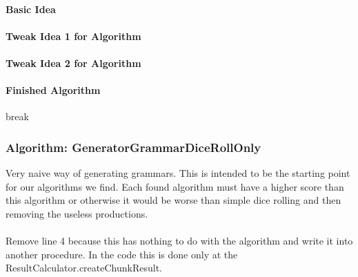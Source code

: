 \paragraph{Basic Idea}

\paragraph{Tweak Idea 1 for Algorithm}

\paragraph{Tweak Idea 2 for Algorithm}

\paragraph{Finished Algorithm}
break
\pagebreak
\subsubsection{Algorithm: GeneratorGrammarDiceRollOnly}
\noindent Very naive way of generating grammars. This is intended to be the starting point for our algorithms we find. Each found algorithm must have a higher score than this algorithm or otherwise it would be worse than simple dice rolling and then removing the useless productions.\\

\noindent
{}\\

\noindent Remove line 4 because this has nothing to do with the algorithm and write it into another procedure. In the code this is done only at the ResultCalculator.createChunkResult.

